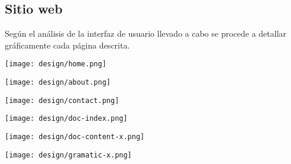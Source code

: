 \subsection{Sitio web}
Según el análisis de la interfaz de usuario llevado a cabo se procede a detallar gráficamente cada página descrita.

\begin{center}
\texttt{[image: design/home.png]} 
\end{center}

\begin{center}
\texttt{[image: design/about.png]} 
\end{center}

\begin{center}
\texttt{[image: design/contact.png]} 
\end{center}

\begin{center}
\texttt{[image: design/doc-index.png]} 
\end{center}

\begin{center}
\texttt{[image: design/doc-content-x.png]} 
\end{center}

\begin{center}
\texttt{[image: design/gramatic-x.png]} 
\end{center}

